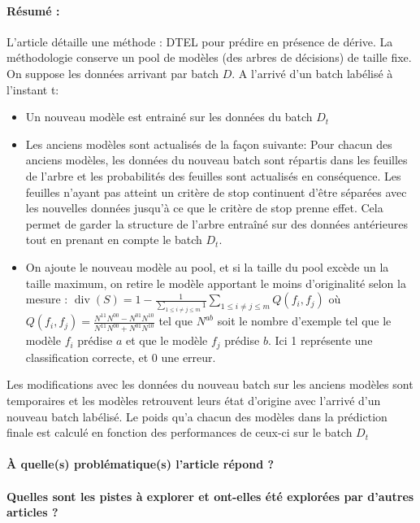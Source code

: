 \documentclass[11pt,a4paper]{report}
\begin{document}
\paragraph{Résumé :} L'article détaille une méthode : DTEL pour prédire en présence de dérive. La méthodologie conserve un pool de modèles (des arbres de décisions) de taille fixe. On suppose les données arrivant par batch $D$. 
A l'arrivé d'un batch labélisé à l'instant t: 
\begin{itemize}
	\item Un nouveau modèle est entrainé sur les données du batch $D_t$
	\item Les anciens modèles sont actualisés de la façon suivante: Pour chacun des anciens modèles, les données du nouveau batch sont répartis dans les feuilles de l'arbre et les probabilités des feuilles sont actualisés en conséquence. Les feuilles n'ayant pas atteint un critère de stop continuent d'être séparées avec les nouvelles données jusqu'à ce que le critère de stop prenne effet. Cela permet de garder la structure de l'arbre entraîné sur des données antérieures tout en prenant en compte le batch $D_t$.
	\item  On ajoute le nouveau modèle au pool, et si la taille du pool excède un la taille maximum, on retire le modèle apportant le moins d'originalité selon la mesure : $\operatorname{div}(S)=1-\frac{1}{\sum_{1 \leq i \neq j \leq m} 1} \sum_{1 \leq i \neq j \leq m} Q\left(f_{i}, f_{j}\right)$ où $Q\left(f_{i}, f_{j}\right)=\frac{N^{11} N^{00}-N^{01} N^{10}}{N^{11} N^{00}+N^{01} N^{10}}$ tel que $N^{ab}$ soit le nombre d'exemple tel que le modèle $f_i$ prédise $a$ et que le modèle $f_j$ prédise $b$. Ici 1 représente une classification correcte, et 0 une erreur.
\end{itemize}

Les  modifications avec les données du nouveau batch sur les anciens modèles sont temporaires et les modèles retrouvent leurs état d'origine avec l'arrivé d'un nouveau batch labélisé. Le poids qu'a chacun des modèles dans la prédiction finale est calculé en fonction des performances de ceux-ci sur le batch $D_t$

\paragraph{À quelle(s) problématique(s) l'article répond ?} 

\paragraph{Quelles sont les pistes à explorer et ont-elles  été explorées par d'autres articles ?} 
\end{document}
